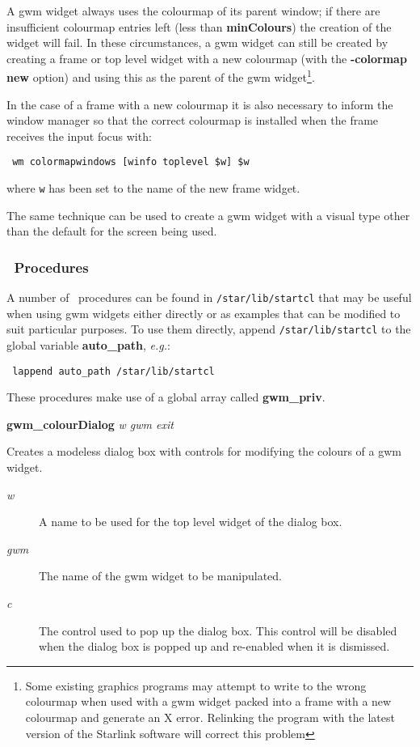 A gwm widget always uses the colourmap of its parent window; if there
are insufficient colourmap entries left (less than {\bf minColours})
the creation of the widget will fail. In these circumstances, a gwm
widget can still be created by creating a frame or top level widget
with a new colourmap (with the {\bf -colormap new} option) and using
this as the parent of the gwm widget\footnote{Some existing graphics
programs may attempt to write to the wrong colourmap when used with a
gwm widget packed into a frame with a new colourmap and generate an X
error. Relinking the program with the latest version of the Starlink
software will correct this problem}.

In the case of a frame with a new colourmap it is also necessary to inform
the window manager so that the correct colourmap is installed when the
frame receives the input focus with:
\begin{tquote}{\tt
wm colormapwindows [winfo toplevel \$w] \$w
}\end{tquote}
where {\tt w} has been set to the name of the new frame widget.

The same technique can be used to create a gwm widget with a visual type
other than the default for the screen being used.

\subsubsection{\Tk\ Procedures}

A number of \Tk\ procedures can be found in {\tt{/star/lib/startcl}} that may
be useful when using gwm widgets either directly or as examples that can be
modified to suit particular purposes. To use them directly, append
{\tt /star/lib/startcl} to the global variable {\bf auto\_path}, {\em{e.g.}}:

\begin{tquote}{\tt
lappend auto\_path /star/lib/startcl
}\end{tquote}

These procedures make use of a global array called {\bf gwm\_priv}.

{\bf gwm\_colourDialog} {\em w gwm exit}
\begin{rquote}
Creates a modeless dialog box with controls for modifying the colours of
a gwm widget.

\begin{description}
\item[{\em w}] A name to be used for the top level widget of the dialog box.
\item[{\em gwm}] The name of the gwm widget to be manipulated.
\item[{\em c}] The control used to pop up the dialog box. This control will
be disabled when the dialog box is popped up and re-enabled when it is
dismissed.

\end{description}
\end{rquote}

